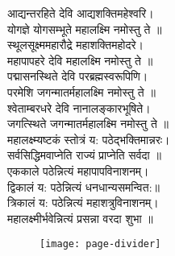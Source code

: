\documentclass[twoside,top=1.7cm, bottom=1.7cm, outer=1cm,landscape, inner=1.5cm,a5paper,]{book}
\begin{document}
\begin{center}
\begin{center}
आद्यन्तरहिते देवि आद्यशक्तिमहेश्वरि।\\
योगज्ञे योगसम्भूते महालक्ष्मि नमोस्तु ते ॥\\[10pt]

स्थूलसूक्ष्ममहारौद्रे महाशक्तिमहोदरे।\\
महापापहरे देवि महालक्ष्मि नमोस्तु ते ॥\\[10pt]

पद्मासनस्थिते देवि परब्रह्मस्वरूपिणि।\\
परमेशि जगन्मातर्महालक्ष्मि नमोस्तु ते ॥\\[10pt]

श्वेताम्बरधरे देवि नानालङ्कारभूषिते।\\
जगत्स्थिते जगन्मातर्महालक्ष्मि नमोस्तु ते ॥\\[10pt]

महालक्ष्म्यष्टकं स्तोत्रं य: पठेद्भक्तिमान्नरः।\\
सर्वसिद्धिमवाप्नेति राज्यं प्राप्नेति सर्वदा ॥\\[10pt]

एककाले पठेन्नित्यं महापापविनाशनम्।\\
द्विकालं य: पठेन्नित्यं धनधान्यसमन्वित:॥\\[10pt]

त्रिकालं य: पठेन्नित्यं महाशत्रुविनाशनम्।\\
महालक्ष्मीर्भवेन्नित्यं प्रसन्ना वरदा शुभा ॥\\[10pt]
\end{center}
\begin{figure}[b]
\centering
\texttt{[image: page-divider]}
\end{figure}
\end{center}
\end{document}
